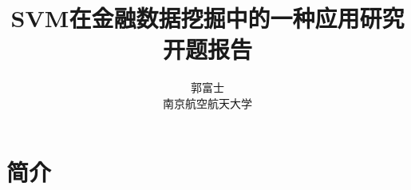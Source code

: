 \documentclass[lang=cn,11pt,a4paper]{elegantpaper}
\title{SVM在金融数据挖掘中的一种应用研究 \\ 开题报告}
\author{郭富士 \\ 南京航空航天大学}
\institute{}
\date{\zhtoday}
\begin{document}
	\maketitle

	\begin{abstract}

	\keywords{}
	\end{abstract}

	\section{简介}
	
	\section{}

	
\end{document}
